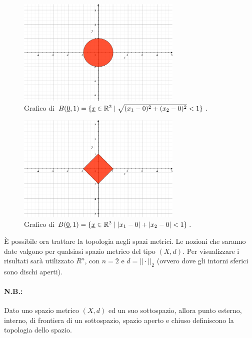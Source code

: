 \begin{figure}
    \centering
    \includegraphics[width=0.7\textwidth]{Analisi2/figures/norma_euclidea.jpg}
    \caption{Grafico di $B(\uline 0, 1)=\{\uline x\in\mathbb R^2\; |\;\sqrt{(x_1-0)^2+(x_2-0)^2}<1\}$.}
    \label{fig:distanza_euclidea_r_1}
\end{figure}

\begin{figure}
    \centering
    \includegraphics[width=0.7\textwidth]{Analisi2/figures/distanza_tassista.jpg}
    \caption{Grafico di $B(\uline 0, 1)=\{\uline x\in\mathbb R^2\; |\; |x_1-0|+|x_2-0|<1\}$.}
    \label{fig:distanza_tassista_r_1}
\end{figure}

È possibile ora trattare la topologia negli spazi metrici. Le nozioni che saranno date valgono per qualsiasi spazio metrico del tipo $(X,d)$. Per visualizzare i risultati sarà utilizzato $R^n$, con $n=2$ e $d=||\cdot||_2$ (ovvero dove gli intorni sferici sono dischi aperti).

\paragraph{N.B.:} Dato uno spazio metrico $(X,d)$ ed un suo \gls{sottospazio}, allora punto esterno, interno, di frontiera di un sottospazio, spazio aperto e chiuso definiscono la topologia dello spazio.

